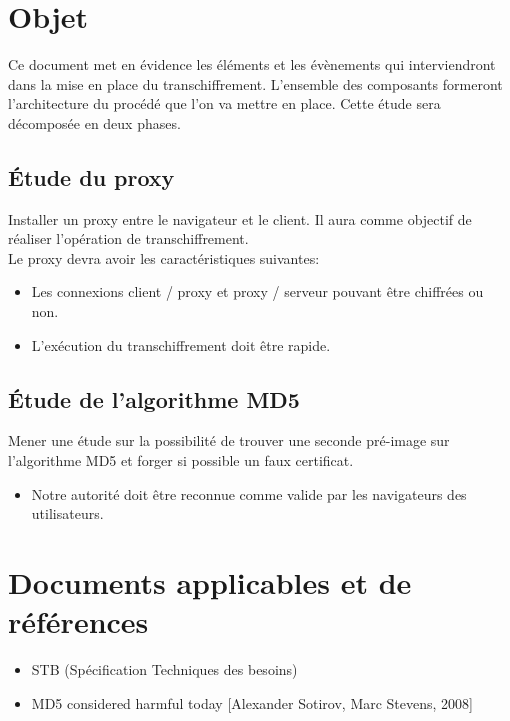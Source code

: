 \documentclass[a4paper,11pt,french]{article}
\begin{document}
\section{Objet}

Ce document met en évidence les éléments et les évènements qui interviendront dans la mise en place du transchiffrement. L'ensemble des composants formeront l'architecture du procédé que l'on va mettre en place. Cette étude sera décomposée en deux phases.  

\subsection{\'Etude du proxy}
Installer un proxy entre le navigateur et le client. Il aura comme objectif de réaliser l'opération de transchiffrement.  \\
Le proxy devra avoir les caractéristiques suivantes:
\begin{itemize}
\item Les connexions client / proxy et proxy / serveur pouvant être  chiffrées ou non.
\item L'exécution du transchiffrement doit être rapide.
\end{itemize}

\subsection{\'Etude de l'algorithme MD5}
Mener une étude sur la possibilité de trouver une seconde pré-image sur l'algorithme MD5 et forger si possible un faux certificat.  \\ 
\begin{itemize}
\item Notre autorité doit être reconnue comme valide par les navigateurs des utilisateurs.
\end{itemize}



\section{Documents applicables et de références}
\begin{itemize}
\item STB (Spécification Techniques des besoins)
\item MD5 considered harmful today [Alexander Sotirov, Marc Stevens, 2008]
\end{itemize}
\end{document}
